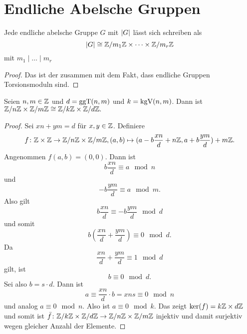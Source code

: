 \section{Endliche Abelsche Gruppen}
\begin{Satz} \label{Satz:StuktEndlAb}
Jede endliche abelsche Gruppe \(G\) mit \(\lvert G\rvert\) lässt sich schreiben als 
\[\lvert G\rvert\cong \mathbb{Z}/m_1\mathbb{Z}\times\dots\times\mathbb{Z}/m_r\mathbb{Z}\] mit \(m_1\mid\dots\mid m_r\)
\end{Satz}
\begin{proof}
    Das ist der  zusammen mit dem Fakt, dass endliche Gruppen Torsionsmoduln sind.
\end{proof}
\begin{Lemma}\label{Lem:ChinRest1}
    Seien \(n,m\in\mathbb{Z}\) und \(d=\operatorname{ggT}(n,m)\) und \(k=\operatorname{kgV}(n,m)\).
    Dann ist \(\mathbb{Z}/n\mathbb{Z}\times\mathbb{Z}/m\mathbb{Z}\cong \mathbb{Z}/k\mathbb{Z}\times\mathbb{Z}/d\mathbb{Z}.\)
\end{Lemma}
\begin{proof}
    Sei \(xn+ym=d\) für \(x,y\in \mathbb{Z}\).
    Definiere \[f\colon \mathbb{Z}\times \mathbb{Z}\to\mathbb{Z}/n\mathbb{Z}\times\mathbb{Z}/m\mathbb{Z}, (a,b)\mapsto (a-b\frac{xn}{d}+n\mathbb{Z},a+b\frac{ym}{d})+m\mathbb{Z}.\]
    Angenommen \(f(a,b)=(0,0)\). Dann ist \[b\frac{xn}{d}\equiv a \mod n\] und \[-b\frac{ym}{d}\equiv a\mod m.\] Also gilt \[b\frac{xn}{d}\equiv -b\frac{ym}{d} \mod d\] und somit \[b(\frac{xn}{d}+\frac{ym}{d})\equiv 0 \mod d.\] Da \[\frac{xn}{d}+\frac{ym}{d}\equiv 1\mod d\] gilt, ist \[b\equiv 0 \mod d.\] Sei also \(b=s\cdot d\). Dann ist \[a\equiv \frac{xn}{d}\cdot b=xns\equiv 0\mod n\] und analog \(a\equiv 0 \mod n\). Also ist \(a\equiv 0\mod k\). Das zeigt \(\ker(f)=k\mathbb{Z}\times d\mathbb{Z}\) und somit ist \(\bar f\colon \mathbb{Z}/k\mathbb{Z}\times \mathbb{Z}/d\mathbb{Z}\to \mathbb{Z}/n\mathbb{Z}\times \mathbb{Z}/m\mathbb{Z}\) injektiv und damit surjektiv wegen gleicher Anzahl der Elemente.
\end{proof}



